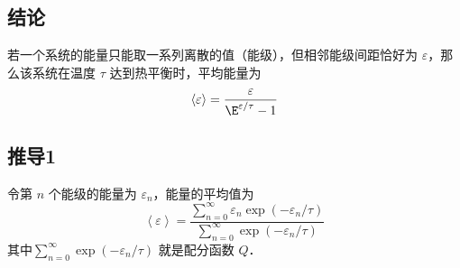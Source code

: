 

\subsection{结论}
若一个系统的能量只能取一系列离散的值（能级），但相邻能级间距恰好为 $\varepsilon$，那么该系统在温度 $\tau$ 达到热平衡时，平均能量为
\begin{equation}
\left\langle \varepsilon  \right\rangle  = \frac{\varepsilon }{{{\E^{\varepsilon /\tau }} - 1}}
\end{equation}

\subsection{推导1}
令第 $n$ 个能级的能量为 ${\varepsilon_n}$，能量的平均值为
\begin{equation}\label{EqCE_eq2}
\left\langle \varepsilon  \right\rangle  = \frac{{\sum\limits_{n = 0}^\infty  {{\varepsilon_n}\exp \left( { - {\varepsilon_n}/\tau } \right)} }}{{\sum\limits_{n = 0}^\infty  {\exp \left( { - {\varepsilon_n}/\tau } \right)} }}
\end{equation}
其中$\sum\limits_{n = 0}^\infty  {\exp \left( { - {\varepsilon_n}/\tau } \right)}$ 就是配分函数 $Q$．

